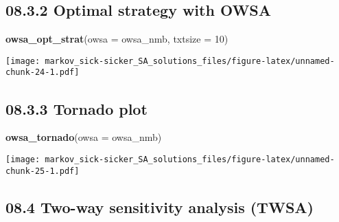 \documentclass[
]{article}
\newenvironment{Shaded}{\begin{snugshade}}{\end{snugshade}}
\newcommand{\DataTypeTok}[1]{\textcolor[rgb]{0.13,0.29,0.53}{#1}}
\newcommand{\DecValTok}[1]{\textcolor[rgb]{0.00,0.00,0.81}{#1}}
\newcommand{\KeywordTok}[1]{\textcolor[rgb]{0.13,0.29,0.53}{\textbf{#1}}}
\newcommand{\NormalTok}[1]{#1}
\begin{document}
\hypertarget{optimal-strategy-with-owsa}{%
\subsection{08.3.2 Optimal strategy with
OWSA}\label{optimal-strategy-with-owsa}}

\begin{Shaded}
\begin{Highlighting}[]
\KeywordTok{owsa_opt_strat}\NormalTok{(}\DataTypeTok{owsa =}\NormalTok{ owsa_nmb, }\DataTypeTok{txtsize =} \DecValTok{10}\NormalTok{)}
\end{Highlighting}
\end{Shaded}

\texttt{[image: markov\_sick-sicker\_SA\_solutions\_files/figure-latex/unnamed-chunk-24-1.pdf]}

\hypertarget{tornado-plot}{%
\subsection{08.3.3 Tornado plot}\label{tornado-plot}}

\begin{Shaded}
\begin{Highlighting}[]
\KeywordTok{owsa_tornado}\NormalTok{(}\DataTypeTok{owsa =}\NormalTok{ owsa_nmb)}
\end{Highlighting}
\end{Shaded}

\texttt{[image: markov\_sick-sicker\_SA\_solutions\_files/figure-latex/unnamed-chunk-25-1.pdf]}

\hypertarget{two-way-sensitivity-analysis-twsa}{%
\subsection{08.4 Two-way sensitivity analysis
(TWSA)}\label{two-way-sensitivity-analysis-twsa}}
\end{document}
